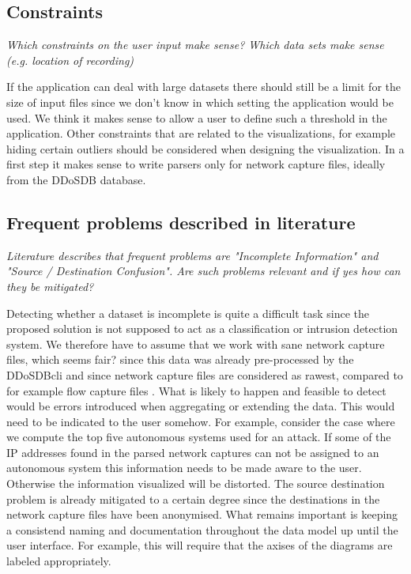     \subsection{Constraints} 
\textit{Which constraints on the user input make sense? Which data sets make sense (e.g. location of recording)
}

If the application can deal with large datasets there should still be a limit for the size of input files since we don't know in which setting the application would be used. We think it makes sense to allow a user to define such a threshold in the application. Other constraints that are related to the visualizations, for example hiding certain outliers should be considered when designing the visualization.
In a first step it makes sense to write parsers only for network capture files, ideally from the DDoSDB database.
    
    \subsection{Frequent problems described in literature} 
    \textit{Literature describes that frequent problems are "Incomplete Information" and "Source / Destination Confusion". Are such problems relevant and if yes how can they be mitigated?}
    
    Detecting whether a dataset is incomplete is quite a difficult task since the proposed solution is not supposed to act as a classification or intrusion detection system. We therefore have to assume that we work with sane network capture files, which seems fair? since this data was already pre-processed by the DDoSDB\-cli and since network capture files are considered as rawest, compared to for example flow capture files \cite{appliedsecurityvisualization}.
    What is likely to happen and feasible to detect would be errors introduced when aggregating or extending the data. This would need to be indicated to the user somehow. For example, consider the case where we compute the top five autonomous systems used for an attack. If some of the IP addresses found in the parsed network captures can not be assigned to an autonomous system this information needs to be made aware to the user. Otherwise the information visualized will be distorted.
    The source destination problem is already mitigated to a certain degree since the destinations in the network capture files have been anonymised. What remains important is keeping a consistend naming and documentation throughout the data model up until the user interface. For example, this will require that the axises of the diagrams are labeled appropriately.
    


